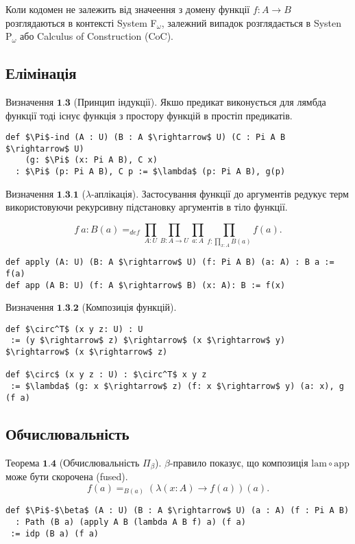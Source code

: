 \documentclass{article}
\theoremstyle{definition}
\begin{document}
Коли кодомен не залежить від значеення з домену функції $f: A \rightarrow B$
розглядаються в контексті System F$_\omega$, залежний випадок розглядається
в  Systen P$_\omega$ або Calculus of Construction (CoC).

\newpage
\subsection{Елімінація}

$\textbf{Визначення\ 1.3}$ (Принцип індукції). Якшо предикат виконується для
лямбда функції тоді існує функція з простору функцій в простіп предикатів.

\begin{lstlisting}[mathescape=true]
def $\Pi$-ind (A : U) (B : A $\rightarrow$ U) (C : Pi A B $\rightarrow$ U)
    (g: $\Pi$ (x: Pi A B), C x)
  : $\Pi$ (p: Pi A B), C p := $\lambda$ (p: Pi A B), g(p)
\end{lstlisting}

\noindent $\textbf{Визначення\ 1.3.1}$ ($\lambda$-аплікація).
Застосування функції до аргументів редукує терм
використовуючи рекурсивну підстановку аргументів в тіло функції.

$$
    f\ a : B(a) =_{def} \prod_{A:U}\prod_{B: A \rightarrow U}\prod_{a:A}\prod_{f: \prod_{x:A}B(a)}f(a).
$$

\begin{lstlisting}[mathescape=true]
def apply (A: U) (B: A $\rightarrow$ U) (f: Pi A B) (a: A) : B a := f(a)
def app (A B: U) (f: A $\rightarrow$ B) (x: A): B := f(x)
\end{lstlisting}

\noindent $\textbf{Визначення\ 1.3.2}$ (Композиція функцій).
\begin{lstlisting}[mathescape=true]
def $\circ^T$ (x y z: U) : U
 := (y $\rightarrow$ z) $\rightarrow$ (x $\rightarrow$ y) $\rightarrow$ (x $\rightarrow$ z)

def $\circ$ (x y z : U) : $\circ^T$ x y z
 := $\lambda$ (g: x $\rightarrow$ z) (f: x $\rightarrow$ y) (a: x), g (f a)
\end{lstlisting}

\subsection{Обчислювальність}

$\textbf{Теорема\ 1.4}$ (Обчислювальність $\Pi_\beta$).
$\beta$-правило показує, що композиція $\mathrm{lam} \circ \mathrm{app}$ може бути скорочена (fused).
$$
    f(a) =_{B(a)} (\lambda (x:A) \rightarrow f(a))(a).
$$
\begin{lstlisting}[mathescape=true]
def $\Pi$-$\beta$ (A : U) (B : A $\rightarrow$ U) (a : A) (f : Pi A B)
  : Path (B a) (apply A B (lambda A B f) a) (f a)
 := idp (B a) (f a)
\end{lstlisting}
\end{document}
